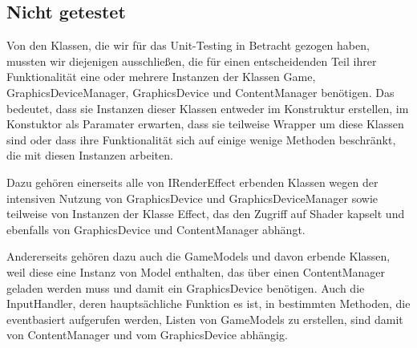 %



\subsection{Nicht getestet}
\label{Abschnitt:Tests:Protokoll:Nicht_durchgefuehrt}

Von den Klassen, die wir für das Unit-Testing in Betracht gezogen haben, mussten wir diejenigen ausschließen, die für einen entscheidenden Teil ihrer Funktionalität eine oder mehrere Instanzen der Klassen Game, GraphicsDeviceManager, GraphicsDevice und ContentManager benötigen. Das bedeutet, dass sie Instanzen dieser Klassen entweder im Konstruktur erstellen, im Konstuktor als Paramater erwarten, dass sie teilweise Wrapper um diese Klassen sind oder dass ihre Funktionalität sich auf einige wenige Methoden beschränkt, die mit diesen Instanzen arbeiten.

Dazu gehören einerseits alle von IRenderEffect erbenden Klassen wegen der intensiven Nutzung von GraphicsDevice und GraphicsDeviceManager sowie teilweise von Instanzen der Klasse Effect, das den Zugriff auf Shader kapselt und ebenfalls von GraphicsDevice und ContentManager abhängt.

Andererseits gehören dazu auch die GameModels und davon erbende Klassen, weil diese eine Instanz von Model enthalten, das über einen ContentManager geladen werden muss und damit ein GraphicsDevice benötigen. Auch die InputHandler, deren hauptsächliche Funktion es ist, in bestimmten Methoden, die eventbasiert aufgerufen werden, Listen von GameModels zu erstellen, sind damit von ContentManager und vom GraphicsDevice abhängig.






